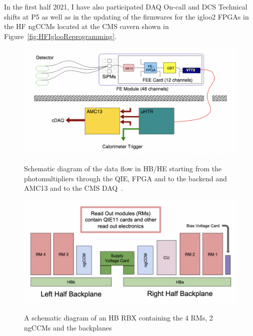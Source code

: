 In the first half 2021, I have also participated DAQ On-call and DCS Technical shifts at P5 as well as in the updating of the firmwares for the igloo2 FPGAs in the HF ngCCMs located at the CMS cavern shown in Figure~\ref{fig:HFIglooReprogramming}. 


\begin{figure}[!htbp]
\centering
\caption{Schematic diagram of the data flow in HB/HE starting from the photomultipliers through the QIE, FPGA and to the backend and AMC13 and to the CMS DAQ~\cite{Cooper:2016kef}.}
\includegraphics[scale=0.6]{fig/CalorimeterTrigger.png}
\label{fig:DataFlowHCAL}
\end{figure}


\begin{figure}[!htbp]
	\centering
    \caption{A schematic diagram of an HB RBX containing the 4 RMs, 2 ngCCMs and the backplanes~\cite{Cummings_phdThesis}}
	\includegraphics[scale=0.7]{fig/RMs.png}
	\label{fig:ReadOutModules}
\end{figure}

